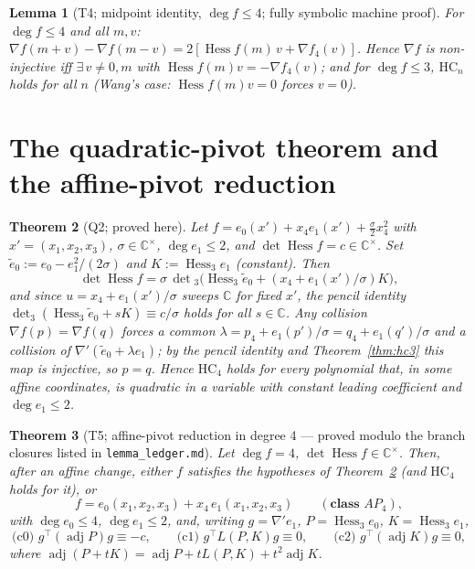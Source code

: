 \documentclass[11pt]{article}
\theoremstyle{plain}
\newtheorem{theorem}{Theorem}[section]
\newtheorem{lemma}[theorem]{Lemma}
\theoremstyle{definition}
\newcommand{\C}{\mathbb{C}}
\newcommand{\Hess}{\operatorname{Hess}}
\newcommand{\adj}{\operatorname{adj}}
\newcommand{\HC}{\mathrm{HC}}
\begin{document}
\begin{lemma}[T4; midpoint identity, $\deg f\le4$; fully symbolic machine
proof]\label{lem:t4}
For $\deg f\le4$ and all $m,v$:
$\nabla f(m+v)-\nabla f(m-v)=2[\Hess f(m)\,v+\nabla f_4(v)]$. Hence $\nabla
f$ is non-injective iff $\exists\,v\ne0,m$ with $\Hess f(m)v=-\nabla
f_4(v)$; and for $\deg f\le3$, $\HC_n$ holds for all $n$ (Wang's case:
$\Hess f(m)v=0$ forces $v=0$).
\end{lemma}

\section{The quadratic-pivot theorem and the affine-pivot reduction}

\begin{theorem}[Q2; proved here]\label{thm:q2}
Let $f=e_0(x')+x_4e_1(x')+\tfrac\sigma2x_4^2$ with $x'=(x_1,x_2,x_3)$,
$\sigma\in\C^\times$, $\deg e_1\le2$, and $\det\Hess f=c\in\C^\times$. Set
$\tilde e_0:=e_0-e_1^2/(2\sigma)$ and $K:=\Hess_3e_1$ (constant). Then
\[
\det\Hess f=\sigma\,\det{}_3\!\bigl(\Hess_3\tilde e_0+(x_4+e_1(x')/\sigma)K\bigr),
\]
and since $u=x_4+e_1(x')/\sigma$ sweeps $\C$ for fixed $x'$, the pencil
identity $\det_3(\Hess_3\tilde e_0+sK)\equiv c/\sigma$ holds for all
$s\in\C$. Any collision $\nabla f(p)=\nabla f(q)$ forces a common
$\lambda=p_4+e_1(p')/\sigma=q_4+e_1(q')/\sigma$ and a collision of
$\nabla'(\tilde e_0+\lambda e_1)$; by the pencil identity and
Theorem~\ref{thm:hc3} this map is injective, so $p=q$. \emph{Hence $\HC_4$
holds for every polynomial that, in some affine coordinates, is quadratic
in a variable with constant leading coefficient and $\deg e_1\le2$.}
\end{theorem}

\begin{theorem}[T5; affine-pivot reduction in degree 4 --- proved modulo the
branch closures listed in \texttt{lemma\_ledger.md}]\label{thm:t5}
Let $\deg f=4$, $\det\Hess f\in\C^\times$. Then, after an affine change,
either $f$ satisfies the hypotheses of Theorem~\ref{thm:q2} (and $\HC_4$
holds for it), or
\[
f=e_0(x_1,x_2,x_3)+x_4\,e_1(x_1,x_2,x_3)\qquad(\textbf{class } AP_4),
\]
with $\deg e_0\le4$, $\deg e_1\le2$, and, writing $g=\nabla'e_1$,
$P=\Hess_3e_0$, $K=\Hess_3e_1$,
\[
\text{(c0) } g^\top(\adj P)g\equiv-c,\qquad
\text{(c1) } g^\top L(P,K)g\equiv0,\qquad
\text{(c2) } g^\top(\adj K)g\equiv0,
\]
where $\adj(P+tK)=\adj P+tL(P,K)+t^2\adj K$.
\end{theorem}
\end{document}
